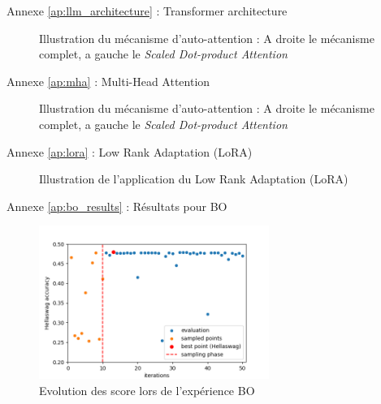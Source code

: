 \begin{frame}{Annexe \ref{ap:llm_architecture} : Transformer architecture}
    \label{ap:llm_architecture}
    \begin{figure}
        \centering
        
        \caption{Illustration du mécanisme d'auto-attention : A droite le mécanisme complet, a gauche le \textit{Scaled Dot-product Attention}}
    \end{figure}
    
\end{frame}

\begin{frame}{Annexe \ref{ap:mha} : Multi-Head Attention}
    \label{ap:mha}
    \begin{figure}
        \centering
        
        \caption{Illustration du mécanisme d'auto-attention : A droite le mécanisme complet, a gauche le \textit{Scaled Dot-product Attention}}
    \end{figure}
    
\end{frame}

\begin{frame}{Annexe \ref{ap:lora} : Low Rank Adaptation (LoRA)}
    \label{ap:lora}
    \begin{figure}
        \centering
        
        \caption{Illustration de l'application du Low Rank Adaptation (LoRA)}
    \end{figure}
    
\end{frame}


\begin{frame}{Annexe \ref{ap:bo_results} : Résultats pour BO}
    \label{ap:bo_results}
    \begin{figure}
        \centering
        \includegraphics[height = 5cm]{assets/imgs/plots/bo/score_evolution.png}
        \caption{Evolution des score lors de l'expérience BO}
    \end{figure}
\end{frame}

